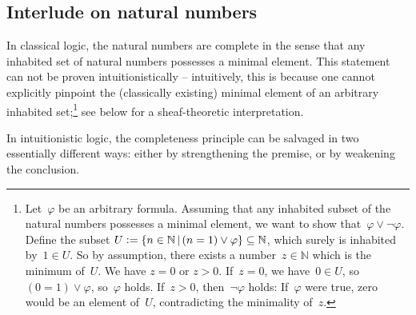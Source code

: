 \documentclass[10pt]{amsart}
\theoremstyle{definition}
\theoremstyle{plain}
\theoremstyle{remark}
\newcommand{\NN}{\mathbb{N}}
\newcommand{\?}{\,{:}\,}
\renewcommand{\_}{\mathpunct{.}\,}
\newcommand{\defeq}{\vcentcolon=}
\begin{document}
\subsection{Interlude on natural numbers}
In classical logic, the natural numbers are complete in the sense that any
inhabited set of natural numbers possesses a minimal element. This statement
can not be proven intuitionistically -- intuitively, this is because one cannot
explicitly pinpoint the (classically existing) minimal element of an arbitrary
inhabited set;\footnote{Let~$\varphi$ be an arbitrary formula. Assuming that
any inhabited subset of the natural numbers possesses a minimal element, we
want to show that~$\varphi \vee \neg\varphi$. Define the subset $U \defeq \{ n \in
\NN \,|\, (n = 1) \vee \varphi \} \subseteq \NN$, which surely is inhabited by~$1
\in U$. So by assumption, there exists a number~$z \in \NN$ which is the
minimum of~$U$. We have $z = 0$ or $z > 0$. If~$z = 0$, we have~$0 \in U$,
so~$(0 = 1) \vee \varphi$, so~$\varphi$ holds.  If~$z > 0$, then~$\neg\varphi$
holds: If~$\varphi$ were true, zero would be an element of~$U$, contradicting
the minimality of~$z$.} see below for a sheaf-theoretic interpretation.

In intuitionistic logic, the completeness principle can be salvaged in two
essentially different ways: either by strengthening the premise, or by
weakening the conclusion.
\end{document}
